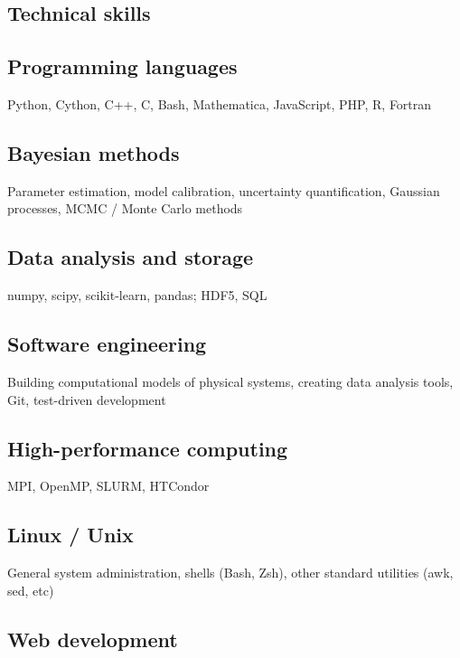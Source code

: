 \documentclass[letterpaper,10pt]{article}
\begin{document}
\begin{multicols}{2}
\columnbreak


\section{Technical skills}

\subsection{Programming languages}

Python, Cython, C++, C, Bash, Mathematica, JavaScript, PHP, R, Fortran

\subsection{Bayesian methods}

Parameter estimation, model calibration, uncertainty quantification, Gaussian processes, MCMC / Monte Carlo methods

\subsection{Data analysis and storage}

numpy, scipy, scikit-learn, pandas;
HDF5, SQL

\subsection{Software engineering}

Building computational models of physical systems, creating data analysis tools, Git, test-driven development

\subsection{High-performance computing}

MPI, OpenMP, SLURM, HTCondor

\subsection{Linux / Unix}

General system administration, shells (Bash, Zsh), other standard utilities (awk, sed, etc)

\subsection{Web development}


\end{multicols}
\end{document}
